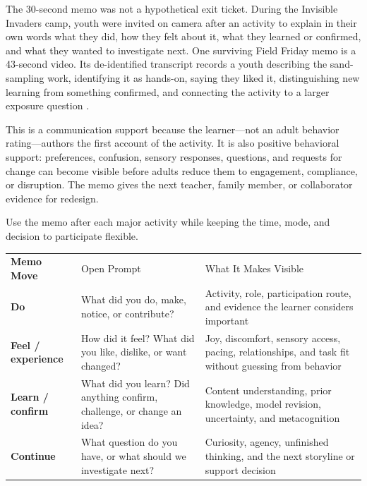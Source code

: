 

The 30-second memo was not a hypothetical exit ticket. During the Invisible Invaders camp, youth were invited on camera after an activity to explain in their own words what they did, how they felt about it, what they learned or confirmed, and what they wanted to investigate next. One surviving Field Friday memo is a 43-second video. Its de-identified transcript records a youth describing the sand-sampling work, identifying it as hands-on, saying they liked it, distinguishing new learning from something confirmed, and connecting the activity to a larger exposure question \citep{campEvidence2026}.

This is a communication support because the learner---not an adult behavior rating---authors the first account of the activity. It is also positive behavioral support: preferences, confusion, sensory responses, questions, and requests for change can become visible before adults reduce them to engagement, compliance, or disruption. The memo gives the next teacher, family member, or collaborator evidence for redesign.


Use the memo after each major activity while keeping the time, mode, and decision to participate flexible.

\small
\renewcommand{\arraystretch}{1.10}
\setlength{\tabcolsep}{4pt}
\begin{tabularx}{\textwidth}{>{\bfseries\RaggedRight\arraybackslash}p{1.25in} >{\RaggedRight\arraybackslash}p{2.55in} >{\RaggedRight\arraybackslash}X}
\rowcolor{PrimaryRed}
\color{white}Memo Move & \color{white}Open Prompt & \color{white}What It Makes Visible \\
Do & What did you do, make, notice, or contribute? & Activity, role, participation route, and evidence the learner considers important \\
\rowcolor{SoftGray}
Feel / experience & How did it feel? What did you like, dislike, or want changed? & Joy, discomfort, sensory access, pacing, relationships, and task fit without guessing from behavior \\
Learn / confirm & What did you learn? Did anything confirm, challenge, or change an idea? & Content understanding, prior knowledge, model revision, uncertainty, and metacognition \\
\rowcolor{SoftGray}
Continue & What question do you have, or what should we investigate next? & Curiosity, agency, unfinished thinking, and the next storyline or support decision \\
\end{tabularx}
\normalsize

